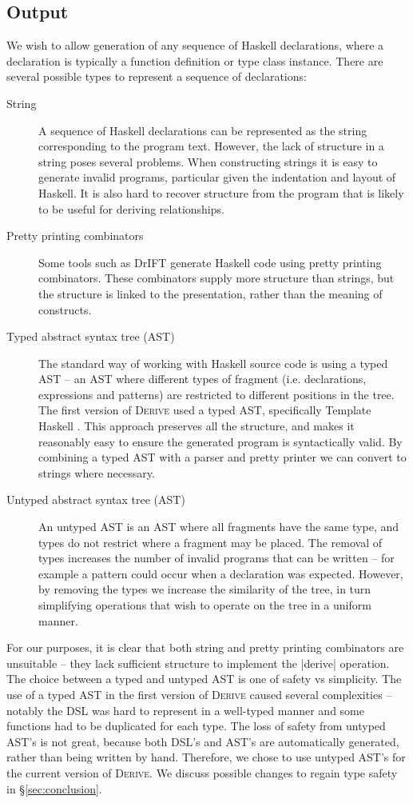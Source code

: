 \documentclass[preprint,draft]{sigplanconf}
\newcommand{\derive}{\textsc{Derive}}
\begin{document}
\subsection{Output}
\label{sec:output}

We wish to allow generation of any sequence of Haskell declarations, where a declaration is typically a function definition or type class instance. There are several possible types to represent a sequence of declarations:

\begin{description}
\item[String] A sequence of Haskell declarations can be represented as the string corresponding to the program text. However, the lack of structure in a string poses several problems. When constructing strings it is easy to generate invalid programs, particular given the indentation and layout of Haskell. It is also hard to recover structure from the program that is likely to be useful for deriving relationships.
\item[Pretty printing combinators] Some tools such as DrIFT \cite{drift} generate Haskell code using pretty printing combinators. These combinators supply more structure than strings, but the structure is linked to the presentation, rather than the meaning of constructs.
\item[Typed abstract syntax tree (AST)] The standard way of working with Haskell source code is using a typed AST -- an AST where different types of fragment (i.e. declarations, expressions and patterns) are restricted to different positions in the tree. The first version of \derive{} used a typed AST, specifically Template Haskell \cite{template_haskell}. This approach preserves all the structure, and makes it reasonably easy to ensure the generated program is syntactically valid. By combining a typed AST with a parser and pretty printer we can convert to strings where necessary.
\item[Untyped abstract syntax tree (AST)] An untyped AST is an AST where all fragments have the same type, and types do not restrict where a fragment may be placed. The removal of types increases the number of invalid programs that can be written -- for example a pattern could occur when a declaration was expected. However, by removing the types we increase the similarity of the tree, in turn simplifying operations that wish to operate on the tree in a uniform manner.
\end{description}

For our purposes, it is clear that both string and pretty printing combinators are unsuitable -- they lack sufficient structure to implement the |derive| operation. The choice between a typed and untyped AST is one of safety vs simplicity. The use of a typed AST in the first version of \derive{} caused several complexities -- notably the DSL was hard to represent in a well-typed manner and some functions had to be duplicated for each type. The loss of safety from untyped AST's is not great, because both DSL's and AST's are automatically generated, rather than being written by hand. Therefore, we chose to use untyped AST's for the current version of \derive{}. We discuss possible changes to regain type safety in \S\ref{sec:conclusion}.
\end{document}
